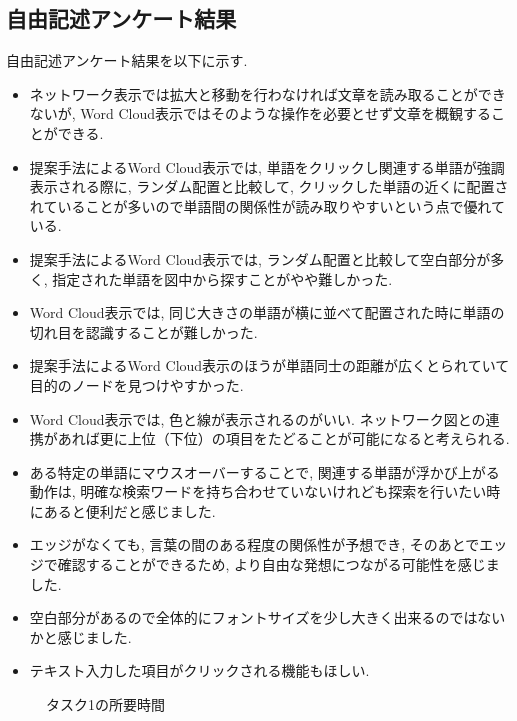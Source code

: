 \documentclass[syuuron]{kuee}
\begin{document}
		\subsection{自由記述アンケート結果}
		自由記述アンケート結果を以下に示す. 
		\begin{itemize}
			\item ネットワーク表示では拡大と移動を行わなければ文章を読み取ることができないが, Word Cloud表示ではそのような操作を必要とせず文章を概観することができる. 
			\item 提案手法によるWord Cloud表示では, 単語をクリックし関連する単語が強調表示される際に, ランダム配置と比較して, クリックした単語の近くに配置されていることが多いので単語間の関係性が読み取りやすいという点で優れている. 
			\item 提案手法によるWord Cloud表示では, ランダム配置と比較して空白部分が多く, 指定された単語を図中から探すことがやや難しかった. 
			\item Word Cloud表示では, 同じ大きさの単語が横に並べて配置された時に単語の切れ目を認識することが難しかった. 
			\item 提案手法によるWord Cloud表示のほうが単語同士の距離が広くとられていて目的のノードを見つけやすかった. 
			\item Word Cloud表示では, 色と線が表示されるのがいい. ネットワーク図との連携があれば更に上位（下位）の項目をたどることが可能になると考えられる. 
			\item ある特定の単語にマウスオーバーすることで, 関連する単語が浮かび上がる動作は, 明確な検索ワードを持ち合わせていないけれども探索を行いたい時にあると便利だと感じました. 
			\item エッジがなくても, 言葉の間のある程度の関係性が予想でき, そのあとでエッジで確認することができるため, より自由な発想につながる可能性を感じました. 
			\item 空白部分があるので全体的にフォントサイズを少し大きく出来るのではないかと感じました. 
			\item テキスト入力した項目がクリックされる機能もほしい. 
		\end{itemize}
		\begin{figure}
			\begin{center}
			\end{center}
			\caption{タスク1の所要時間}
	  		\label{fig:res1}
		\end{figure}
\end{document}

